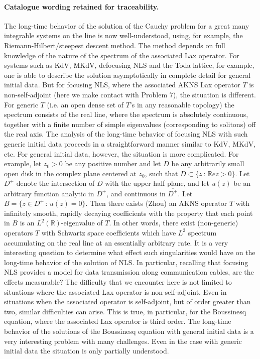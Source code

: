 \documentclass[11pt]{article}
\begin{document}
\paragraph{Catalogue wording retained for traceability.}
The long-time behavior of the solution of the Cauchy problem for a great many integrable systems on the line is now well-understood, using, for example, the Riemann-Hilbert/steepest descent method. The method depends on full knowledge of the nature of the spectrum of the associated Lax operator. For systems such as KdV, MKdV, defocusing NLS and the Toda lattice, for example, one is able to describe the solution asymptotically in complete detail for general initial data. But for focusing NLS, where the associated AKNS Lax operator $T$ is non-self-adjoint (here we make contact with Problem 7), the situation is different. For generic $T$ (i.e. an open dense set of $T$'s in any reasonable topology) the spectrum consists of the real line, where the spectrum is absolutely continuous, together with a finite number of simple eigenvalues (corresponding to solitons) off the real axis. The analysis of the long-time behavior of focusing NLS with such generic initial data proceeds in a straightforward manner similar to KdV, MKdV, etc. For general initial data, however, the situation is more complicated. For example, let $z_0>0$ be any positive number and let $D$ be any arbitrarily small open disk in the complex plane centered at $z_0$, such that $D\subset\{z\,:\,\mathbb{R}e z>0\}$. Let $D^+$ denote the intersection of $D$ with the upper half plane, and let $u(z)$ be an arbitrary function analytic in $D^+$, and continuous in $\overline{D^+}$. Let $B=\{z\in D^+\,:\, u(z)=0\}$. Then there exists (Zhou) an AKNS operator $T$ with infinitely smooth, rapidly decaying coefficients with the property that each point in $B$ is an $L^2(\mathbb{R})$-eigenvalue of $T$. In other words, there exist (non-generic) operators $T$ with Schwartz space coefficients which have $L^2$ spectrum accumulating on the real line at an essentially arbitrary rate. It is a very interesting question to determine what effect such singularities would have on the long-time behavior of the solution of NLS. In particular, recalling that focusing NLS provides a model for data transmission along communication cables, are the effects measurable? The difficulty that we encounter here is not limited to situations where the associated Lax operator is non-self-adjoint. Even in situations when the associated operator is self-adjoint, but of order greater than two, similar difficulties can arise. This is true, in particular, for the Boussinesq equation, where the associated Lax operator is third order. The long-time behavior of the solutions of the Boussinesq equation with general initial data is a very interesting problem with many challenges. Even in the case with generic initial data the situation is only partially understood.
\end{document}

